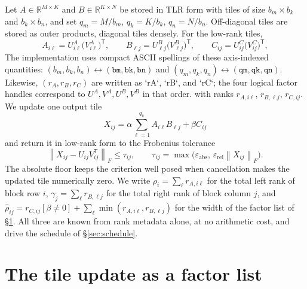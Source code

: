 \documentclass[11pt]{article}
\newcommand{\R}{\mathbb{R}}
\newcommand{\T}{\mathsf{T}}
\newcommand{\Fnorm}[1]{\left\|#1\right\|_F}
\begin{document}
Let $A\in\R^{M\times K}$ and $B\in\R^{K\times N}$ be stored in TLR form with
tiles of size $b_m\times b_k$ and $b_k\times b_n$, and set $q_m=M/b_m$,
$q_k=K/b_k$, $q_n=N/b_n$. Off-diagonal tiles are stored as outer products,
diagonal tiles densely. For the low-rank tiles,
\[
A_{i\ell}=U^A_{i\ell}\bigl(V^A_{i\ell}\bigr)^{\T},
\qquad
B_{\ell j}=U^B_{\ell j}\bigl(V^B_{\ell j}\bigr)^{\T},
\qquad
C_{ij}=U^C_{ij}\bigl(V^C_{ij}\bigr)^{\T},
\]
The implementation uses compact ASCII spellings of these axis-indexed quantities:
$(b_m,b_k,b_n)\leftrightarrow(\texttt{bm},\texttt{bk},\texttt{bn})$ and
$(q_m,q_k,q_n)\leftrightarrow(\texttt{qm},\texttt{qk},\texttt{qn})$.
Likewise, $(r_A,r_B,r_C)$ are written as `rA`, `rB`, and `rC`; the four
logical factor handles correspond to $U^A,V^A,U^B,V^B$ in that order.
with ranks $r_{A,i\ell}$, $r_{B,\ell j}$, $r_{C,ij}$. We update one output tile
\begin{equation}
\label{eq:update}
X_{ij}=\alpha\sum_{\ell=1}^{q_k}A_{i\ell}B_{\ell j}+\beta C_{ij}
\end{equation}
and return it in low-rank form to the Frobenius tolerance
\begin{equation}
\label{eq:tol}
\Fnorm{X_{ij}-U_{ij}V_{ij}^{\T}}\le\tau_{ij},
\qquad
\tau_{ij}=\max\bigl(\varepsilon_{\mathrm{abs}},\,
\varepsilon_{\mathrm{rel}}\Fnorm{X_{ij}}\bigr).
\end{equation}
The absolute floor keeps the criterion well posed when cancellation makes the
updated tile numerically zero. We write
$\rho_i=\sum_\ell r_{A,i\ell}$ for the total left rank of block row $i$,
$\gamma_j=\sum_\ell r_{B,\ell j}$ for the total right rank of block column $j$,
and
$\hat\rho_{ij}=r_{C,ij}[\beta\ne0]+\sum_\ell\min(r_{A,i\ell},r_{B,\ell j})$
for the width of the factor list of \S\ref{sec:factorlist}. All three are known
from rank metadata alone, at no arithmetic cost, and drive the schedule of
\S\ref{sec:schedule}.

\section{The tile update as a factor list}
\label{sec:factorlist}
\end{document}
